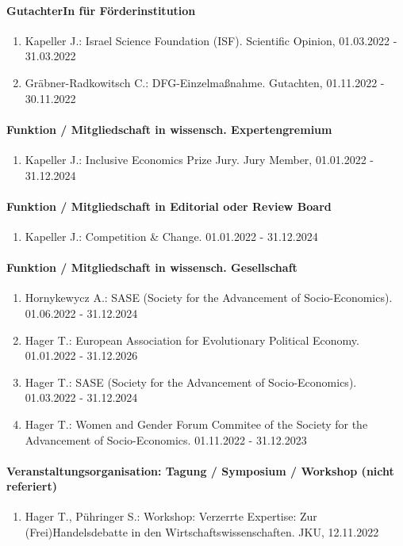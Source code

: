 \paragraph{GutachterIn für Förderinstitution} 
\begin{enumerate}[leftmargin=*, labelsep=0.5cm] 
 	 \item Kapeller J.: Israel Science Foundation (ISF). Scientific Opinion, 01.03.2022 - 31.03.2022 
	 \item Gräbner-Radkowitsch C.: DFG-Einzelmaßnahme. Gutachten, 01.11.2022 - 30.11.2022 
\end{enumerate} 
\paragraph{Funktion / Mitgliedschaft in wissensch. Expertengremium} 
\begin{enumerate}[leftmargin=*, labelsep=0.5cm] 
 	 \item Kapeller J.: Inclusive Economics Prize Jury. Jury Member, 01.01.2022 - 31.12.2024 
\end{enumerate} 
\paragraph{Funktion / Mitgliedschaft in Editorial oder Review Board} 
\begin{enumerate}[leftmargin=*, labelsep=0.5cm] 
 	 \item Kapeller J.: Competition & Change. 01.01.2022 - 31.12.2024 
\end{enumerate} 
\paragraph{Funktion / Mitgliedschaft in wissensch. Gesellschaft} 
\begin{enumerate}[leftmargin=*, labelsep=0.5cm] 
 	 \item Hornykewycz A.: SASE (Society for the Advancement of Socio-Economics). 01.06.2022 - 31.12.2024 
	 \item Hager T.: European Association for Evolutionary Political Economy. 01.01.2022 - 31.12.2026 
	 \item Hager T.: SASE (Society for the Advancement of Socio-Economics). 01.03.2022 - 31.12.2024 
	 \item Hager T.: Women and Gender Forum Commitee of the Society for the Advancement of Socio-Economics. 01.11.2022 - 31.12.2023 
\end{enumerate} 
\paragraph{Veranstaltungsorganisation: Tagung / Symposium / Workshop (nicht referiert)} 
\begin{enumerate}[leftmargin=*, labelsep=0.5cm] 
 	 \item Hager T., Pühringer S.: Workshop: Verzerrte Expertise: Zur (Frei)Handelsdebatte in den Wirtschaftswissenschaften. JKU, 12.11.2022 
\end{enumerate} 
